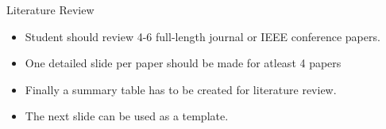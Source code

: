 \begin{frame}{Literature Review}
\begin{itemize}
  \item Student should review 4-6 full-length journal or IEEE conference papers.
  \item One detailed slide per paper should be made for atleast 4 papers
  \item Finally a summary table has to be created for literature review.
  \item The next slide can be used as a template.
\end{itemize}
\end{frame}
